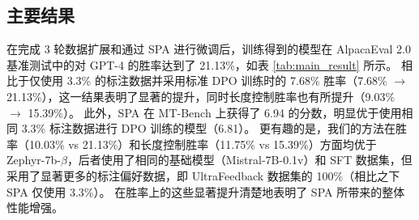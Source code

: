 \begin{table}[t]
    \centering
    \caption{\textbf{偏好判断基线比较。} 在 AlpacaEval 2.0 和 MT-Bench 上，使用不同偏好判断方法对迭代训练模型（从 SFT 模型开始）进行评估的结果。最佳分数以 \textbf{加粗} 标出。}%
    \label{tab:judgments}
\end{table}

\subsection{主要结果}\label{sec:5.2}
在完成 3 轮数据扩展和通过 SPA 进行微调后，训练得到的模型在 AlpacaEval 2.0 基准测试中的对 GPT-4 的胜率达到了 21.13\%，如表 \ref{tab:main_result} 所示。
相比于仅使用 3.3\% 的标注数据并采用标准 DPO 训练时的 7.68\% 胜率（7.68\% $\rightarrow$ 21.13\%），这一结果表明了显著的提升，同时长度控制胜率也有所提升（9.03\% $\rightarrow$ 15.39\%）。
此外，SPA 在 MT-Bench 上获得了 6.94 的分数，明显优于使用相同 3.3\% 标注数据进行 DPO 训练的模型（6.81）。
更有趣的是，我们的方法在胜率（10.03\% vs 21.13\%）和长度控制胜率（11.75\% vs 15.39\%）方面均优于 Zephyr-7b-$\beta$，后者使用了相同的基础模型（Mistral-7B-0.1v）和 SFT 数据集，但采用了显著更多的标注偏好数据，即 UltraFeedback 数据集的 100\%（相比之下 SPA 仅使用 3.3\%）。
在胜率上的这些显著提升清楚地表明了 SPA 所带来的整体性能增强。

